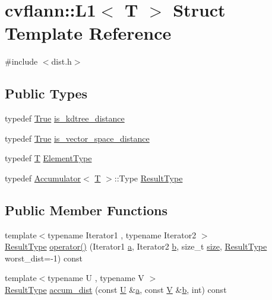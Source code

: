 \hypertarget{structcvflann_1_1L1}{\section{cvflann\-:\-:L1$<$ T $>$ Struct Template Reference}
\label{structcvflann_1_1L1}
}


{\ttfamily \#include $<$dist.\-h$>$}

\subsection*{Public Types}
\begin{DoxyCompactItemize}
\item 
typedef \hyperlink{classcvflann_1_1True}{True} \hyperlink{structcvflann_1_1L1_aa3e6c602907baa81d90ddcfc33041874}{is\-\_\-kdtree\-\_\-distance}
\item 
typedef \hyperlink{classcvflann_1_1True}{True} \hyperlink{structcvflann_1_1L1_a1df70c0d506c0446a8e55d60c697a55c}{is\-\_\-vector\-\_\-space\-\_\-distance}
\item 
typedef \hyperlink{calib3d_8hpp_a3efb9551a871ddd0463079a808916717}{T} \hyperlink{structcvflann_1_1L1_a2e5f85d35af395e5654465e9a69643c0}{Element\-Type}
\item 
typedef \hyperlink{structcvflann_1_1Accumulator}{Accumulator}$<$ \hyperlink{calib3d_8hpp_a3efb9551a871ddd0463079a808916717}{T} $>$\-::Type \hyperlink{structcvflann_1_1L1_a4b809418ce6bf89439d5dbd0ccd42220}{Result\-Type}
\end{DoxyCompactItemize}
\subsection*{Public Member Functions}
\begin{DoxyCompactItemize}
\item 
{\footnotesize template$<$typename Iterator1 , typename Iterator2 $>$ }\\\hyperlink{structcvflann_1_1L1_a4b809418ce6bf89439d5dbd0ccd42220}{Result\-Type} \hyperlink{structcvflann_1_1L1_ad243d0a072c18dbbb63956cc429ffea2}{operator()} (Iterator1 \hyperlink{legacy_8hpp_a1031d0e0a97a340abfe0a6ab9e831045}{a}, Iterator2 \hyperlink{legacy_8hpp_ac04272e8ca865b8fba18d36edae9fd2a}{b}, size\-\_\-t \hyperlink{legacy_8hpp_ae97003f8d5c64cdfb99f6f2606d121b6}{size}, \hyperlink{structcvflann_1_1L1_a4b809418ce6bf89439d5dbd0ccd42220}{Result\-Type} worst\-\_\-dist=-\/1) const 
\item 
{\footnotesize template$<$typename U , typename V $>$ }\\\hyperlink{structcvflann_1_1L1_a4b809418ce6bf89439d5dbd0ccd42220}{Result\-Type} \hyperlink{structcvflann_1_1L1_a09418975ebb5949306d3298c71241c6c}{accum\-\_\-dist} (const \hyperlink{core__c_8h_aa9c521f41af9a5191e5e4b6ffbae211a}{U} \&\hyperlink{legacy_8hpp_a1031d0e0a97a340abfe0a6ab9e831045}{a}, const \hyperlink{core__c_8h_ad8dd4fff0e3910932187b6de0543cae1}{V} \&\hyperlink{legacy_8hpp_ac04272e8ca865b8fba18d36edae9fd2a}{b}, int) const 
\end{DoxyCompactItemize}


